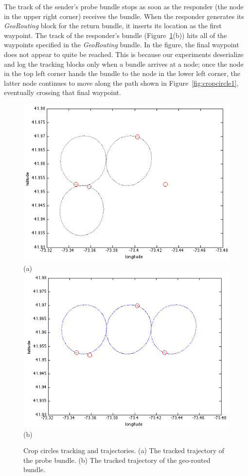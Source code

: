 The track of the sender's probe bundle stops as soon as the responder
(the node in the upper right corner) receives the bundle. When the
responder generates its {\em GeoRouting} block for the return bundle,
it inserts its location as the first waypoint. The track of the
responder's bundle (Figure~\ref{fig:cropCirclesExperiment}(b)) hits
all of the waypoints specified in the {\em GeoRouting} bundle. In the
figure, the final waypoint does not appear to quite be reached. This
is because our experiments deserialize and log the tracking blocks
only when a bundle arrives at a node; once the node in the top left
corner hands the bundle to the node in the lower left corner, the
latter node continues to move along the path shown in
Figure~\ref{fig:cropcircle1}, eventually crossing that final waypoint.
\begin{figure}[!h]
\begin{center}
\includegraphics[width=.8\columnwidth]{figures/cropCirclesExperiment2.png}\\
(a)\\
\includegraphics[width=.8\columnwidth]{figures/cropCirclesExperiment.png}\\
(b)\\
\end{center}
\vspace{-.5cm}
\caption{Crop circles tracking and trajectories. (a) The tracked
  trajectory of the probe bundle. (b) The tracked trajectory of the
  geo-routed bundle.}
\label{fig:cropCirclesExperiment}
\vspace{-.25cm}
\end{figure}


